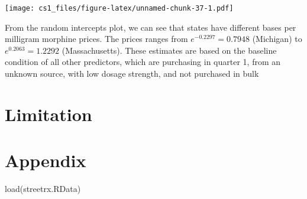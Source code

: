 \documentclass[
  11pt,
]{article}
\newenvironment{Shaded}{\begin{snugshade}}{\end{snugshade}}
\newcommand{\CommentTok}[1]{\textcolor[rgb]{0.56,0.35,0.01}{\textit{#1}}}
\newcommand{\FunctionTok}[1]{\textcolor[rgb]{0.00,0.00,0.00}{#1}}
\newcommand{\NormalTok}[1]{#1}
\newcommand{\StringTok}[1]{\textcolor[rgb]{0.31,0.60,0.02}{#1}}
\begin{document}
\texttt{[image: cs1\_files/figure-latex/unnamed-chunk-37-1.pdf]}

From the random intercepts plot, we can see that states have different
bases per milligram morphine prices. The prices ranges from
\(e^{-0.2297} = 0.7948\) (Michigan) to \(e^{0.2063} = 1.2292\)
(Massachusetts). These estimates are based on the baseline condition of
all other predictors, which are purchasing in quarter 1, from an unknown
source, with low dosage strength, and not purchased in bulk

\hypertarget{limitation}{%
\section{Limitation}\label{limitation}}

\newpage

\hypertarget{appendix}{%
\section{Appendix}\label{appendix}}

\begin{Shaded}
\end{Shaded}

\begin{Shaded}
\begin{Highlighting}[]
\FunctionTok{load}\NormalTok{(}\StringTok{\textquotesingle{}streetrx.RData\textquotesingle{}}\NormalTok{)}
\end{Highlighting}
\end{Shaded}
\end{document}
